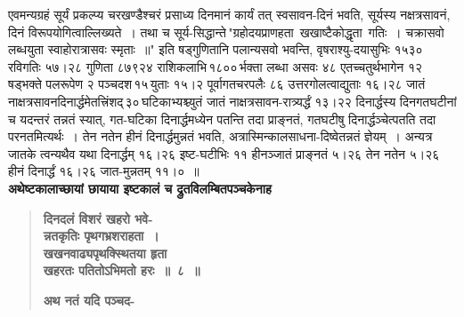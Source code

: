 \documentclass[11pt, openany]{book}
\begin{document}
\newpage

\noindent एवमन्यग्रहं सूर्यं प्रकल्प्य चरखण्डैश्चरं प्रसाध्य दिनमानं कार्यं तत् स्वसावन-दिनं भवति, सूर्यस्य नक्षत्रसावनं, दिनं विरूपयोगित्वाल्लिख्यते~। तथा च {\color{violet}सूर्य-सिद्धान्ते\textendash \,"ग्रहोदयप्राणहता \,खखाष्टैकोद्धृता \,गतिः~। चक्रासवो \;लब्धयुता स्वाहोरात्रासवः स्मृताः~॥"} इति षड्गुणितानि पलान्यसवो भवन्ति, वृषराश्यु-दयासुभिः १५३० रविगतिः ५७।२८ गुणिता ८७९२४ राशिकलाभि\textendash \,१८००\textendash \,र्भक्ता लब्धा असवः ४८ एतच्चतुर्थभागेन १२ षड्भक्ते पलरूपेण २ पञ्चदश\textendash \,१५\textendash \,युताः \;१५।२ \;पूर्वागतचरपलैः \;८६ \;उत्तरगोलत्वाद्युताः \;१६।२८ \;जातं नाक्षत्रसावनदिनार्द्धमेतत्त्रिंशद्\textendash \,३०\textendash \,घटिकाभ्यश्च्युतं \;जातं \;नाक्षत्रसावन-रात्र्यर्द्धं \;१३।२२ \;दिनार्द्धस्य \;दिनगतघटीनां \;च \;यदन्तरं \;तन्नतं \;स्यात्, \;गत-घटिका दिनार्द्धमध्येन पतन्ति तदा प्राङ्नतं, गतघटीषु दिनार्द्धञ्चेत्पतति तदा परनतमित्यर्थः~। तेन नतेन हीनं दिनार्द्धमुन्नतं भवति, अत्रास्मिन्कालसाधना-दिष्वेतन्नतं \;ज्ञेयम्~। अन्यत्र \;जातके \;त्वन्यथैव \;यथा \;दिनार्द्धम् \;१६।२६ \;इष्ट-घटीभिः ११ हीनञ्जातं प्राङ्नतं ५।२६ तेन नतेन ५।२६ हीनं दिनार्द्धं १६।२६ जात-मुन्नतम् ११।०~॥\\

{\small \textbf{अथेष्टकालाच्छायां छायाया इष्टकालं च द्रुतविलम्बितपञ्चकेनाह\textendash }}

 \label{3.8}
\begin{quote}
{\large \textbf{{\color{purple}दिनदलं विशरं खहरो भवे-\\
न्नतकृतिः पृथगभ्रशराहता~। \\
खखनवाढ्यपृथक्स्थितया हृता \\
खहरतः पतितोऽभिमतो हरः~॥~८~॥}}
\vspace{1mm}

\textbf{{\color{purple}अथ नतं यदि पञ्चद-}}}
\end{quote}

\newpage
\end{document}
